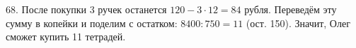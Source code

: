 68. После покупки 3 ручек останется $120-3\cdot12=84$  рубля. Переведём эту сумму в копейки и поделим с остатком: $8400:750=11$ (ост. 150). Значит, Олег сможет купить 11 тетрадей.\\

